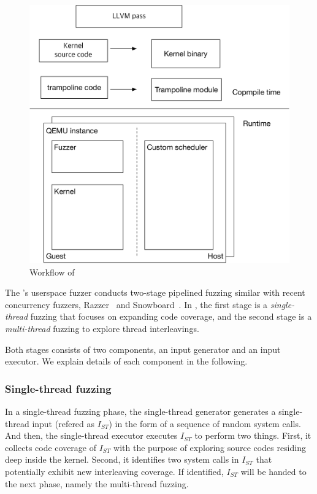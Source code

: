 \begin{figure}
  \includegraphics[width=0.9\linewidth]{fig/architecture.pdf}
  \caption{Workflow of \sys {}}
  \label{fig:workflow}
\end{figure}


The \sys's userspace fuzzer conducts two-stage pipelined fuzzing
similar with recent concurrency fuzzers, Razzer~\cite{razzer} and
Snowboard~\cite{snowboard}.
%
In \sys, the first stage is a \textit{single-thread} fuzzing that
focuses on expanding code coverage, and the second stage is a
\textit{multi-thread} fuzzing to explore thread interleavings.

Both stages consists of two components, an input generator and an
input executor. We explain details of each component in the following.


\subsubsection{Single-thread fuzzing}
%
In a single-thread fuzzing phase, the single-thread generator
generates a single-thread input (refered as $I_{ST}$) in the form of a
sequence of random system calls.
%
And then, the single-thread executor executes $I_{ST}$ to perform two
things.
%
First, it collects code coverage of $I_{ST}$ with the purpose of
exploring source codes residing deep inside the kernel.
%
Second, it identifies two system calls in $I_{ST}$ that potentially
exhibit new interleaving coverage.  If identified, $I_{ST}$ will be
handed to the next phase, namely the multi-thread fuzzing.


